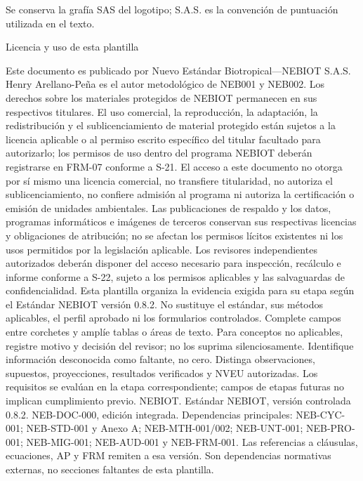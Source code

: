 \vspace{2mm}
{\sffamily\fontsize{7.5}{9.5}\selectfont\color{NEBGray}Se conserva la grafía SAS del logotipo; S.A.S. es la convención de puntuación utilizada en el texto.\par}
\clearpage
{\fontsize{23}{27}\selectfont\color{NEBGreen}Licencia y uso de esta plantilla\par}
\vspace{5mm}
Este documento es publicado por Nuevo Estándar Biotropical—NEBIOT S.A.S. Henry Arellano-Peña es el autor metodológico de NEB001 y NEB002. Los derechos sobre los materiales protegidos de NEBIOT permanecen en sus respectivos titulares. El uso comercial, la reproducción, la adaptación, la redistribución y el sublicenciamiento de material protegido están sujetos a la licencia aplicable o al permiso escrito específico del titular facultado para autorizarlo; los permisos de uso dentro del programa NEBIOT deberán registrarse en FRM-07 conforme a S-21. El acceso a este documento no otorga por sí mismo una licencia comercial, no transfiere titularidad, no autoriza el sublicenciamiento, no confiere admisión al programa ni autoriza la certificación o emisión de unidades ambientales. Las publicaciones de respaldo y los datos, programas informáticos e imágenes de terceros conservan sus respectivas licencias y obligaciones de atribución; no se afectan los permisos lícitos existentes ni los usos permitidos por la legislación aplicable. Los revisores independientes autorizados deberán disponer del acceso necesario para inspección, recálculo e informe conforme a S-22, sujeto a los permisos aplicables y las salvaguardas de confidencialidad.
Esta plantilla organiza la evidencia exigida para su etapa según el Estándar NEBIOT versión 0.8.2. No sustituye el estándar, sus métodos aplicables, el perfil aprobado ni los formularios controlados. Complete campos entre corchetes y amplíe tablas o áreas de texto. Para conceptos no aplicables, registre motivo y decisión del revisor; no los suprima silenciosamente. Identifique información desconocida como faltante, no cero. Distinga observaciones, supuestos, proyecciones, resultados verificados y NVEU autorizadas. Los requisitos se evalúan en la etapa correspondiente; campos de etapas futuras no implican cumplimiento previo.
{\sffamily\fontsize{9}{11}\selectfont [1] NEBIOT. Estándar NEBIOT, versión controlada 0.8.2. NEB-DOC-000, edición integrada. Dependencias principales: NEB-CYC-001; NEB-STD-001 y Anexo A; NEB-MTH-001/002; NEB-UNT-001; NEB-PRO-001; NEB-MIG-001; NEB-AUD-001 y NEB-FRM-001. Las referencias a cláusulas, ecuaciones, AP y FRM remiten a esa versión. Son dependencias normativas externas, no secciones faltantes de esta plantilla.}
